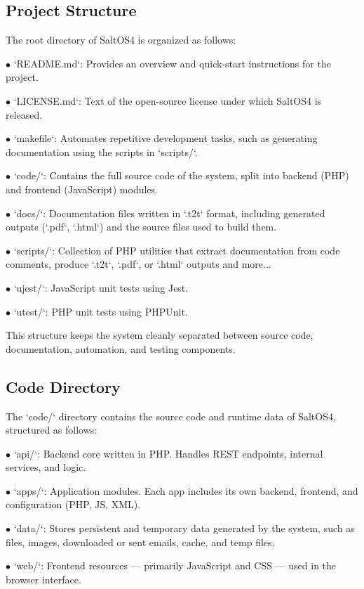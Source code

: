 \documentclass[a4paper]{article}
\begin{document}
\hypertarget{toc3}{}
\subsection{Project Structure}

The root directory of SaltOS4 is organized as follows:

\begin{compactitem}
\item[\color{myblue}$\bullet$] `README.md`: Provides an overview and quick-start instructions for the project.
\item[\color{myblue}$\bullet$] `LICENSE.md`: Text of the open-source license under which SaltOS4 is released.
\item[\color{myblue}$\bullet$] `makefile`: Automates repetitive development tasks, such as generating documentation using the scripts in `scripts/`.
\item[\color{myblue}$\bullet$] `code/`: Contains the full source code of the system, split into backend (PHP) and frontend (JavaScript) modules.
\item[\color{myblue}$\bullet$] `docs/`: Documentation files written in `.t2t` format, including generated outputs (`.pdf`, `.html`) and the source files used to build them.
\item[\color{myblue}$\bullet$] `scripts/`: Collection of PHP utilities that extract documentation from code comments, produce `.t2t`, `.pdf`, or `.html` outputs and more...
\item[\color{myblue}$\bullet$] `ujest/`: JavaScript unit tests using Jest.
\item[\color{myblue}$\bullet$] `utest/`: PHP unit tests using PHPUnit.
\end{compactitem}

This structure keeps the system cleanly separated between source code, documentation, automation, and testing components.

\hypertarget{toc4}{}
\subsection{Code Directory}

The `code/` directory contains the source code and runtime data of SaltOS4, structured as follows:

\begin{compactitem}
\item[\color{myblue}$\bullet$] `api/`: Backend core written in PHP. Handles REST endpoints, internal services, and logic.
\item[\color{myblue}$\bullet$] `apps/`: Application modules. Each app includes its own backend, frontend, and configuration (PHP, JS, XML).
\item[\color{myblue}$\bullet$] `data/`: Stores persistent and temporary data generated by the system, such as files, images, downloaded or sent emails, cache, and temp files.
\item[\color{myblue}$\bullet$] `web/`: Frontend resources — primarily JavaScript and CSS — used in the browser interface.
\end{compactitem}
\end{document}

